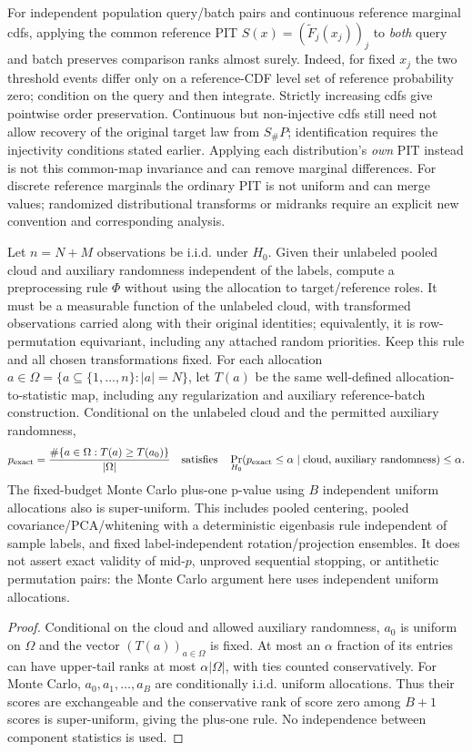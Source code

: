 {For independent population query/batch pairs and continuous reference marginal cdfs, applying the common reference PIT $S(x)=(\widetilde F_j(x_j))_j$ to \emph{both} query and batch preserves comparison ranks almost surely. Indeed, for fixed $x_j$ the two threshold events differ only on a reference-CDF level set of reference probability zero; condition on the query and then integrate. Strictly increasing cdfs give pointwise order preservation. Continuous but non-injective cdfs still need not allow recovery of the original target law from $S_\#P$; identification requires the injectivity conditions stated earlier. Applying each distribution's \emph{own} PIT instead is not this common-map invariance and can remove marginal differences. For discrete reference marginals the ordinary PIT is not uniform and can merge values; randomized distributional transforms or midranks require an explicit new convention and corresponding analysis.

\begin{proposition}\label{prop:pooled-preprocess-valid}
Let $n=N+M$ observations be i.i.d. under $H_0$. Given their unlabeled pooled cloud and auxiliary randomness independent of the labels, compute a preprocessing rule $\Phi$ without using the allocation to target/reference roles. It must be a measurable function of the unlabeled cloud, with transformed observations carried along with their original identities; equivalently, it is row-permutation equivariant, including any attached random priorities. Keep this rule and all chosen transformations fixed. For each allocation $a\in\Omega=\{a\subseteq\{1,\ldots,n\}:|a|=N\}$, let $T(a)$ be the same well-defined allocation-to-statistic map, including any regularization and auxiliary reference-batch construction. Conditional on the unlabeled cloud and the permitted auxiliary randomness,
\[
p_{\rm exact}=\frac{\#\{a\in\Omega:T(a)\ge T(a_0)\}}{|\Omega|}
\quad\text{satisfies}\quad
\Pr_{H_0}(p_{\rm exact}\le\alpha\mid\text{cloud, auxiliary randomness})\le\alpha.
\]
The fixed-budget Monte Carlo plus-one p-value using $B$ independent uniform allocations also is super-uniform. This includes pooled centering, pooled covariance/PCA/whitening with a deterministic eigenbasis rule independent of sample labels, and fixed label-independent rotation/projection ensembles. It does not assert exact validity of mid-$p$, unproved sequential stopping, or antithetic permutation pairs: the Monte Carlo argument here uses independent uniform allocations.
\end{proposition}
\begin{proof}
Conditional on the cloud and allowed auxiliary randomness, $a_0$ is uniform on $\Omega$ and the vector $(T(a))_{a\in\Omega}$ is fixed. At most an $\alpha$ fraction of its entries can have upper-tail ranks at most $\alpha|\Omega|$, with ties counted conservatively. For Monte Carlo, $a_0,a_1,\ldots,a_B$ are conditionally i.i.d. uniform allocations. Thus their scores are exchangeable and the conservative rank of score zero among $B+1$ scores is super-uniform, giving the plus-one rule. No independence between component statistics is used.
\end{proof}

}
